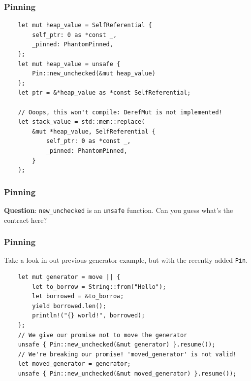 \documentclass[aspectratio=1610,t]{beamer}
\begin{document}

\begin{frame}[fragile]
\frametitle{Pinning}
\begin{verbatim}
    let mut heap_value = SelfReferential {
        self_ptr: 0 as *const _,
        _pinned: PhantomPinned,
    };
    let mut heap_value = unsafe {
        Pin::new_unchecked(&mut heap_value)
    };
    let ptr = &*heap_value as *const SelfReferential;

    // Ooops, this won't compile: DerefMut is not implemented!
    let stack_value = std::mem::replace(
        &mut *heap_value, SelfReferential {
            self_ptr: 0 as *const _,
            _pinned: PhantomPinned,
        }
    );
\end{verbatim}
\end{frame}


\begin{frame}[fragile]
\frametitle{Pinning}
\textbf{Question}: \texttt{new\_unchecked} is an \texttt{unsafe} function. Can you guess what's the contract here?

\end{frame}


\begin{frame}[fragile]
\frametitle{Pinning}
Take a look in out previous generator example, but with the recently added \texttt{Pin}.

\begin{verbatim}
    let mut generator = move || {
        let to_borrow = String::from("Hello");
        let borrowed = &to_borrow;
        yield borrowed.len();
        println!("{} world!", borrowed);
    };
    // We give our promise not to move the generator
    unsafe { Pin::new_unchecked(&mut generator) }.resume());
    // We're breaking our promise! 'moved_generator' is not valid!
    let moved_generator = generator;
    unsafe { Pin::new_unchecked(&mut moved_generator) }.resume());
\end{verbatim}
\end{frame}
\end{document}
